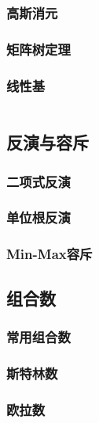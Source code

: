 \documentclass[a4paper, twoside]{article}
\begin{document}
\begin{multicols}{2}
				\subsubsection{高斯消元}
					
				\subsubsection{矩阵树定理}
					
				\subsubsection{线性基}
					\inputminted{cpp}{../src-midori/math/线性基上二分.cpp}
			
			\subsection{反演与容斥}
				\subsubsection{二项式反演}
					
				\subsubsection{单位根反演}
					
				\subsubsection{Min-Max容斥}
					
			
			\subsection{组合数}
				\subsubsection{常用组合数}
					
				\subsubsection{斯特林数}
					
				\subsubsection{欧拉数}
					


\end{multicols}
\end{document}
